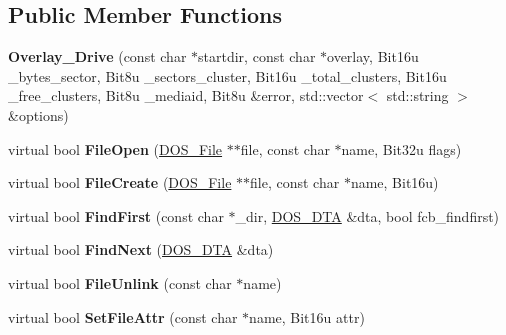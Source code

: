 \subsection*{Public Member Functions}
\begin{DoxyCompactItemize}
\item 
\hypertarget{classOverlay__Drive_aafc1901de31ece7c6904118e3755f9cc}{{\bfseries Overlay\-\_\-\-Drive} (const char $\ast$startdir, const char $\ast$overlay, Bit16u \-\_\-bytes\-\_\-sector, Bit8u \-\_\-sectors\-\_\-cluster, Bit16u \-\_\-total\-\_\-clusters, Bit16u \-\_\-free\-\_\-clusters, Bit8u \-\_\-mediaid, Bit8u \&error, std\-::vector$<$ std\-::string $>$ \&options)}\label{classOverlay__Drive_aafc1901de31ece7c6904118e3755f9cc}

\item 
\hypertarget{classOverlay__Drive_acfb0b879fb91b038f0f6b8a4277d4577}{virtual bool {\bfseries File\-Open} (\hyperlink{classDOS__File}{D\-O\-S\-\_\-\-File} $\ast$$\ast$file, const char $\ast$name, Bit32u flags)}\label{classOverlay__Drive_acfb0b879fb91b038f0f6b8a4277d4577}

\item 
\hypertarget{classOverlay__Drive_a59947fc191882f1ee412e7e1a7c3aed4}{virtual bool {\bfseries File\-Create} (\hyperlink{classDOS__File}{D\-O\-S\-\_\-\-File} $\ast$$\ast$file, const char $\ast$name, Bit16u)}\label{classOverlay__Drive_a59947fc191882f1ee412e7e1a7c3aed4}

\item 
\hypertarget{classOverlay__Drive_abed255e88ae6b16ce51e040adb5a21da}{virtual bool {\bfseries Find\-First} (const char $\ast$\-\_\-dir, \hyperlink{classDOS__DTA}{D\-O\-S\-\_\-\-D\-T\-A} \&dta, bool fcb\-\_\-findfirst)}\label{classOverlay__Drive_abed255e88ae6b16ce51e040adb5a21da}

\item 
\hypertarget{classOverlay__Drive_af0066c9366aa8eb554893f9b338ddb76}{virtual bool {\bfseries Find\-Next} (\hyperlink{classDOS__DTA}{D\-O\-S\-\_\-\-D\-T\-A} \&dta)}\label{classOverlay__Drive_af0066c9366aa8eb554893f9b338ddb76}

\item 
\hypertarget{classOverlay__Drive_a06211e8916760d5b88fcef625a7b3168}{virtual bool {\bfseries File\-Unlink} (const char $\ast$name)}\label{classOverlay__Drive_a06211e8916760d5b88fcef625a7b3168}

\item 
\hypertarget{classOverlay__Drive_a00e13abca30fc9aaecd7445cfd8a0beb}{virtual bool {\bfseries Set\-File\-Attr} (const char $\ast$name, Bit16u attr)}\label{classOverlay__Drive_a00e13abca30fc9aaecd7445cfd8a0beb}


\end{DoxyCompactItemize}
